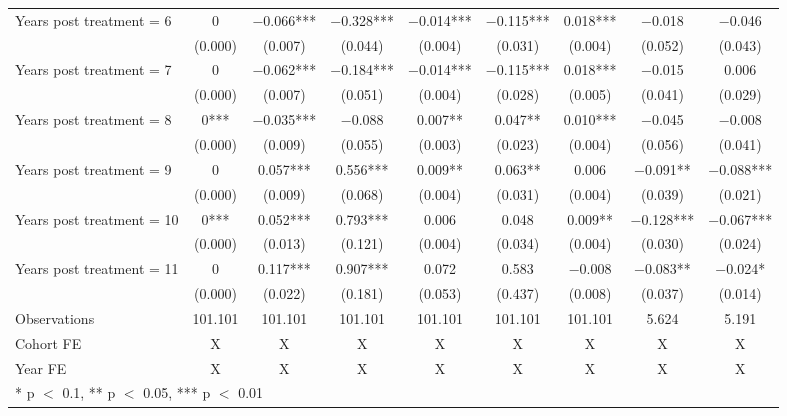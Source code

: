\begin{table}[H]
{\begin{threeparttable}
\begin{tabular}[t]{lcccccccc}
Years post treatment = 6 & \num{0} & \num{-0.066}*** & \num{-0.328}*** & \num{-0.014}*** & \num{-0.115}*** & \num{ 0.018}*** & \num{-0.018} & \num{-0.046}\\
 & (\num{0.000}) & (\num{0.007}) & (\num{0.044}) & (\num{0.004}) & (\num{0.031}) & (\num{0.004}) & (\num{0.052}) & (\num{0.043})\\
Years post treatment = 7 & \num{0} & \num{-0.062}*** & \num{-0.184}*** & \num{-0.014}*** & \num{-0.115}*** & \num{ 0.018}*** & \num{-0.015} & \num{ 0.006}\\
 & (\num{0.000}) & (\num{0.007}) & (\num{0.051}) & (\num{0.004}) & (\num{0.028}) & (\num{0.005}) & (\num{0.041}) & (\num{0.029})\\
Years post treatment = 8 & \num{0}*** & \num{-0.035}*** & \num{-0.088} & \num{ 0.007}** & \num{ 0.047}** & \num{ 0.010}*** & \num{-0.045} & \num{-0.008}\\
 & (\num{0.000}) & (\num{0.009}) & (\num{0.055}) & (\num{0.003}) & (\num{0.023}) & (\num{0.004}) & (\num{0.056}) & (\num{0.041})\\
Years post treatment = 9 & \num{0} & \num{ 0.057}*** & \num{ 0.556}*** & \num{ 0.009}** & \num{ 0.063}** & \num{ 0.006} & \num{-0.091}** & \num{-0.088}***\\
 & (\num{0.000}) & (\num{0.009}) & (\num{0.068}) & (\num{0.004}) & (\num{0.031}) & (\num{0.004}) & (\num{0.039}) & (\num{0.021})\\
Years post treatment = 10 & \num{0}*** & \num{ 0.052}*** & \num{ 0.793}*** & \num{ 0.006} & \num{ 0.048} & \num{ 0.009}** & \num{-0.128}*** & \num{-0.067}***\\
 & (\num{0.000}) & (\num{0.013}) & (\num{0.121}) & (\num{0.004}) & (\num{0.034}) & (\num{0.004}) & (\num{0.030}) & (\num{0.024})\\
Years post treatment = 11 & \num{0} & \num{ 0.117}*** & \num{ 0.907}*** & \num{ 0.072} & \num{ 0.583} & \num{-0.008} & \num{-0.083}** & \num{-0.024}*\\
 & (\num{0.000}) & (\num{0.022}) & (\num{0.181}) & (\num{0.053}) & (\num{0.437}) & (\num{0.008}) & (\num{0.037}) & (\num{0.014})\\
\midrule
Observations & \num{101,101} & \num{101,101} & \num{101,101} & \num{101,101} & \num{101,101} & \num{101,101} & \num{5,624} & \num{5,191}\\
Cohort FE & X & X & X & X & X & X & X & X\\
Year FE & X & X & X & X & X & X & X & X\\
\bottomrule
\multicolumn{9}{l}{\rule{0pt}{1em}* p $<$ 0.1, ** p $<$ 0.05, *** p $<$ 0.01}\\

\end{tabular}
\end{threeparttable}}
\end{table}
